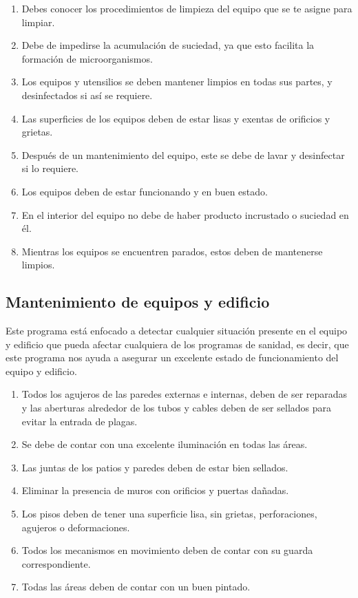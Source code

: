 \begin{enumerate}
	\item Debes conocer los procedimientos de limpieza del equipo que se te asigne para limpiar.
	\item Debe de impedirse la acumulación de suciedad, ya que esto facilita la formación de microorganismos.
	\item Los equipos y utensilios se deben mantener limpios en todas sus partes, y desinfectados si así se requiere.
	\item Las superficies de los equipos deben de estar lisas y exentas de orificios y grietas.
	\item Después de un mantenimiento del equipo, este se debe de lavar y desinfectar si lo requiere.
	\item Los equipos deben de estar funcionando y en buen estado.
	\item En el interior del equipo no debe de haber producto incrustado o suciedad en él.
	\item Mientras los equipos se encuentren parados, estos deben de mantenerse limpios.
\end{enumerate}

\subsection{Mantenimiento de equipos y edificio}

Este programa está enfocado a detectar cualquier situación presente en el equipo y edificio que pueda afectar cualquiera de los programas de sanidad, es decir, que este programa nos ayuda a asegurar un excelente estado de funcionamiento del equipo y edificio.

\begin{enumerate}
	\item Todos los agujeros de las paredes externas e internas, deben de ser reparadas y las aberturas alrededor de los tubos y cables deben de ser sellados para evitar la entrada de plagas.
	\item Se debe de contar con una excelente iluminación en todas las áreas.
	\item Las juntas de los patios y paredes deben de estar bien sellados.
	\item Eliminar la presencia de muros con orificios y puertas dañadas.
	\item Los pisos deben de tener una superficie lisa, sin grietas, perforaciones, agujeros o deformaciones.
	\item Todos los mecanismos en movimiento deben de contar con su guarda correspondiente.
	\item Todas las áreas deben de contar con un buen pintado.
\end{enumerate}

